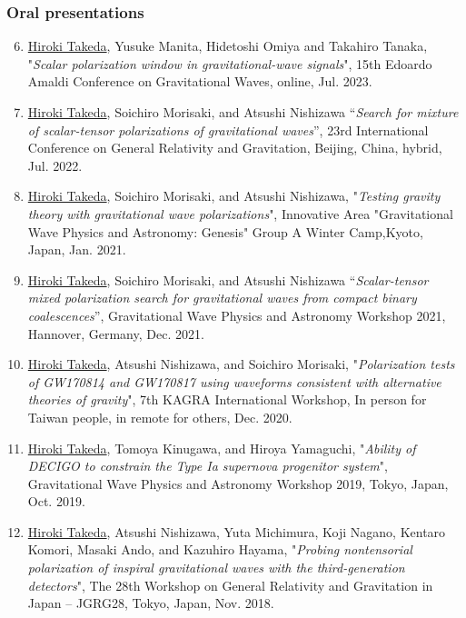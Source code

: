 \documentclass[uplatex, 12pt]{article}
\begin{document}
\subsubsection*{Oral presentations}
\begin{enumerate}
\setcounter{enumi}{5}
\item \uline{Hiroki Takeda}, Yusuke Manita, Hidetoshi Omiya and Takahiro Tanaka, "\emph{Scalar polarization window in gravitational-wave signals}", 15th Edoardo Amaldi Conference on Gravitational Waves, online, Jul. 2023.\\

\item \uline{Hiroki Takeda}, Soichiro Morisaki, and Atsushi Nishizawa “\emph{Search for mixture of scalar-tensor polarizations of gravitational waves}”, 23rd International Conference on General Relativity and Gravitation, Beijing, China, hybrid, Jul. 2022.\\

\item \uline{Hiroki Takeda}, Soichiro Morisaki, and Atsushi Nishizawa,
"\emph{Testing gravity theory with gravitational wave polarizations}",
Innovative Area "Gravitational Wave Physics and Astronomy: Genesis" Group A Winter Camp,Kyoto, Japan, Jan. 2021.\\

\item \uline{Hiroki Takeda}, Soichiro Morisaki, and Atsushi Nishizawa “\emph{Scalar-tensor mixed polarization search for gravitational waves from compact binary coalescences}”, Gravitational Wave Physics and Astronomy Workshop 2021, Hannover, Germany, Dec. 2021.\\

\item \uline{Hiroki Takeda}, Atsushi Nishizawa, and Soichiro Morisaki, "\emph{Polarization tests of GW170814 and GW170817 using waveforms consistent with alternative theories of gravity}", 7th KAGRA International Workshop, In person for Taiwan people, in remote for others, Dec. 2020.\\

\item \uline{Hiroki Takeda}, Tomoya Kinugawa, and Hiroya Yamaguchi, "\emph{Ability of DECIGO to constrain the Type Ia supernova progenitor system}", Gravitational Wave Physics and Astronomy Workshop 2019, Tokyo, Japan, Oct. 2019.\\

\item \uline{Hiroki Takeda}, Atsushi Nishizawa, Yuta Michimura, Koji Nagano, Kentaro Komori, Masaki Ando, and Kazuhiro Hayama, "\emph{Probing nontensorial polarization of inspiral gravitational waves with the third-generation detectors}", The 28th Workshop on General Relativity and Gravitation in Japan – JGRG28, Tokyo, Japan, Nov. 2018.\\


\end{enumerate}
\end{document}
